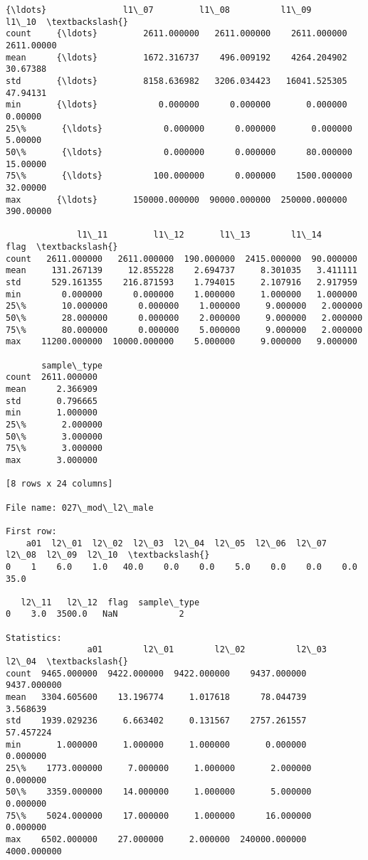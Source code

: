 \documentclass[11pt]{article}
\begin{document}
\begin{Verbatim}[commandchars=\\\{\}]
          {\ldots}               l1\_07         l1\_08          l1\_09       l1\_10  \textbackslash{}
count     {\ldots}         2611.000000   2611.000000    2611.000000  2611.00000   
mean      {\ldots}         1672.316737    496.009192    4264.204902    30.67388   
std       {\ldots}         8158.636982   3206.034423   16041.525305    47.94131   
min       {\ldots}            0.000000      0.000000       0.000000     0.00000   
25\%       {\ldots}            0.000000      0.000000       0.000000     5.00000   
50\%       {\ldots}            0.000000      0.000000      80.000000    15.00000   
75\%       {\ldots}          100.000000      0.000000    1500.000000    32.00000   
max       {\ldots}       150000.000000  90000.000000  250000.000000   390.00000   

              l1\_11         l1\_12       l1\_13        l1\_14       flag  \textbackslash{}
count   2611.000000   2611.000000  190.000000  2415.000000  90.000000   
mean     131.267139     12.855228    2.694737     8.301035   3.411111   
std      529.161355    216.871593    1.794015     2.107916   2.917959   
min        0.000000      0.000000    1.000000     1.000000   1.000000   
25\%       10.000000      0.000000    1.000000     9.000000   2.000000   
50\%       28.000000      0.000000    2.000000     9.000000   2.000000   
75\%       80.000000      0.000000    5.000000     9.000000   2.000000   
max    11200.000000  10000.000000    5.000000     9.000000   9.000000   

       sample\_type  
count  2611.000000  
mean      2.366909  
std       0.796665  
min       1.000000  
25\%       2.000000  
50\%       3.000000  
75\%       3.000000  
max       3.000000  

[8 rows x 24 columns]

File name: 027\_mod\_l2\_male

First row: 
    a01  l2\_01  l2\_02  l2\_03  l2\_04  l2\_05  l2\_06  l2\_07  l2\_08  l2\_09  l2\_10  \textbackslash{}
0    1    6.0    1.0   40.0    0.0    0.0    5.0    0.0    0.0    0.0   35.0   

   l2\_11   l2\_12  flag  sample\_type  
0    3.0  3500.0   NaN            2  

Statistics: 
                a01        l2\_01        l2\_02          l2\_03        l2\_04  \textbackslash{}
count  9465.000000  9422.000000  9422.000000    9437.000000  9437.000000   
mean   3304.605600    13.196774     1.017618      78.044739     3.568639   
std    1939.029236     6.663402     0.131567    2757.261557    57.457224   
min       1.000000     1.000000     1.000000       0.000000     0.000000   
25\%    1773.000000     7.000000     1.000000       2.000000     0.000000   
50\%    3359.000000    14.000000     1.000000       5.000000     0.000000   
75\%    5024.000000    17.000000     1.000000      16.000000     0.000000   
max    6502.000000    27.000000     2.000000  240000.000000  4000.000000   


\end{Verbatim}
\end{document}
